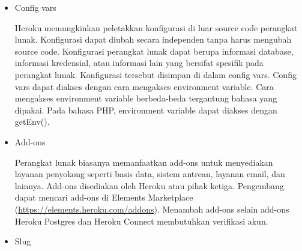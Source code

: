\documentclass[a4paper,twoside]{article}
\begin{document}
\begin{enumerate}
\begin{itemize}
\begin{itemize}
\begin{itemize}
				\item Config vars
		
				Heroku memungkinkan peletakkan konfigurasi di luar source code perangkat lunak. Konfigurasi dapat diubah secara independen tanpa harus mengubah source code. Konfigurasi perangkat lunak dapat berupa informasi database, informasi kredensial, atau informasi lain yang bersifat spesifik pada perangkat lunak. Konfigurasi tersebut disimpan di dalam config vars. Config vars dapat diakses dengan cara mengakses environment variable. Cara mengakses environment variable berbeda-beda tergantung bahasa yang dipakai. Pada bahasa PHP, environment variable dapat diakses dengan getEnv().
		
				\item Add-ons
		
				Perangkat lunak biasanya memanfaatkan add-ons untuk menyediakan layanan penyokong seperti basis data, sistem antrean, layanan email, dan lainnya. Add-ons disediakan oleh Heroku atau pihak ketiga. Pengembang dapat mencari add-ons di Elements Marketplace (\url{https://elements.heroku.com/addons}). Menambah add-ons selain add-ons Heroku Postgres dan Heroku Connect membutuhkan verifikasi akun.

				\item Slug
		

\end{itemize}
\end{itemize}
\end{itemize}
\end{enumerate}
\end{document}
